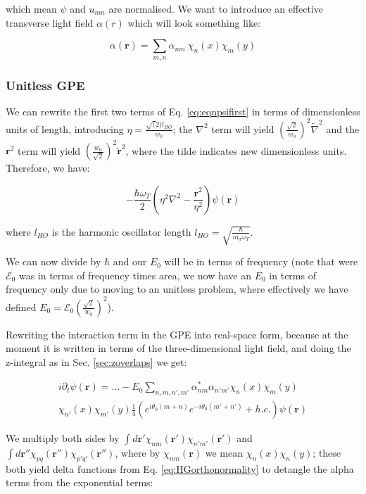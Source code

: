 \documentclass[a4paper,twocolumn,nobalancelastpage]{revtex4-1}
\newcommand{\vect}[1]{\mathbf{#1}}
\newcommand{\lho}{l_{HO}}
\begin{document}
which mean $\psi$ and $u_{mn}$ are normalised.
We want to introduce an effective transverse light field $\alpha(r)$ which will look something like:

\begin{equation}
\label{eq:fulllightfieldR}
\alpha(\textbf{r})= \sum_{m,n} \alpha_{nm} \  \chi_{n}(x) \chi_m (y)
\end{equation}

\subsubsection{Unitless GPE}

We can rewrite the first two terms of Eq. \ref{eq:eqnpsifirst} in terms of dimensionless units of length, introducing $\eta=\frac{\sqrt(2) \lho}{w_0}$; the $\nabla^2$ term will yield $\left(\frac{\sqrt{2}}{w_0}\right) ^2 \tilde{\nabla}^2$ and the $\textbf{r}^2$ term will yield $\left(\frac{w_0}{\sqrt{2}}\right) ^2 \tilde{\textbf{r}}^2$, where the tilde indicates new dimensionless units.
Therefore, we have:

\begin{equation}
\label{eq:oscillatorpartPsiRealSpace}
- \frac{\hbar \omega_T}{2} 
 \left( \eta^2 \nabla^2-\frac{\textbf{r}^2}{\eta^2}\right) \psi(\textbf{r}) \end{equation}

where $\lho$ is the harmonic oscillator length $\lho=\sqrt{\frac{\hbar}{m_a \omega_T}}$.

We can now divide by $\hbar$ and our $E_0$ will be in terms of frequency (note that were $\mathcal{E}_0 $ was in terms of frequency times area, we now have an $E_0$ in terms of frequency only due to moving to an unitless problem, where effectively we have defined $E_0= \mathcal{E}_0 \left( \frac{\sqrt{2}}{w_0}\right)^2$).

Rewriting the interaction term in the GPE into real-space form, because at the moment it is written in terms of the three-dimensional light field, and doing the z-integral as in Sec. \ref{sec:zoverlaps} we get:

\begin{multline}
i\partial_t \psi(\textbf{r})= ... - E_0 
\sum_{n,m,n',m'} \alpha_{nm}^* \alpha_{n'm'}
 \chi_n (x) \chi_m (y) \\ \chi_{n'} (x) \chi_{m'} (y)
 \frac{1}{4}  \left(e^{i\theta_0(m+n)}e^{-i\theta_0(m'+n')}+h.c. \right)
\psi(\vect{r})
\end{multline}

We multiply both sides by $\int d\textbf{r}' \chi_{nm} (\textbf{r}') \chi_{n'm'} (\textbf{r}')$ and $\int d\textbf{r}'' \chi_{pq} (\textbf{r}'') \chi_{p'q'} (\textbf{r}'')$, where by $\chi_{nm} (\textbf{r})$ we mean $\chi_n(x) \chi_n(y)$; these both yield delta functions from Eq. \ref{eq:HGorthonormality} to detangle the alpha terms from the exponential terms:
\end{document}
